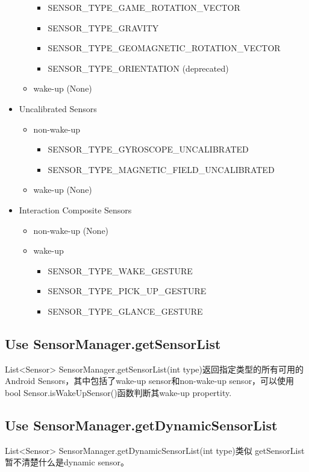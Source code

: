\documentclass{article}
\begin{document}
\begin{itemize}
\begin{itemize}
\begin{itemize}
      \item SENSOR\_TYPE\_GAME\_ROTATION\_VECTOR
      \item SENSOR\_TYPE\_GRAVITY
      \item SENSOR\_TYPE\_GEOMAGNETIC\_ROTATION\_VECTOR
      \item SENSOR\_TYPE\_ORIENTATION (deprecated)
      \end{itemize}
    \item wake-up (None)
    \end{itemize}
  \item Uncalibrated Sensors
    \begin{itemize}
    \item non-wake-up
      \begin{itemize}
      \item SENSOR\_TYPE\_GYROSCOPE\_UNCALIBRATED
      \item SENSOR\_TYPE\_MAGNETIC\_FIELD\_UNCALIBRATED
      \end{itemize}
    \item wake-up (None)
    \end{itemize}
  \item Interaction Composite Sensors
    \begin{itemize}
    \item non-wake-up (None)
    \item wake-up
      \begin{itemize}
      \item SENSOR\_TYPE\_WAKE\_GESTURE
      \item SENSOR\_TYPE\_PICK\_UP\_GESTURE
      \item SENSOR\_TYPE\_GLANCE\_GESTURE
      \end{itemize}
    \end{itemize}
\end{itemize}

\subsection{Use SensorManager.getSensorList}
List<Sensor> SensorManager.getSensorList(int type)返回指定类型的所有可用的
Android Sensors，其中包括了wake-up sensor和non-wake-up sensor，可以使用
bool Sensor.isWakeUpSensor()函数判断其wake-up propertity.

\subsection{Use SensorManager.getDynamicSensorList}
List<Sensor> SensorManager.getDynamicSensorList(int type)类似
getSensorList暂不清楚什么是dynamic sensor。
\end{document}
